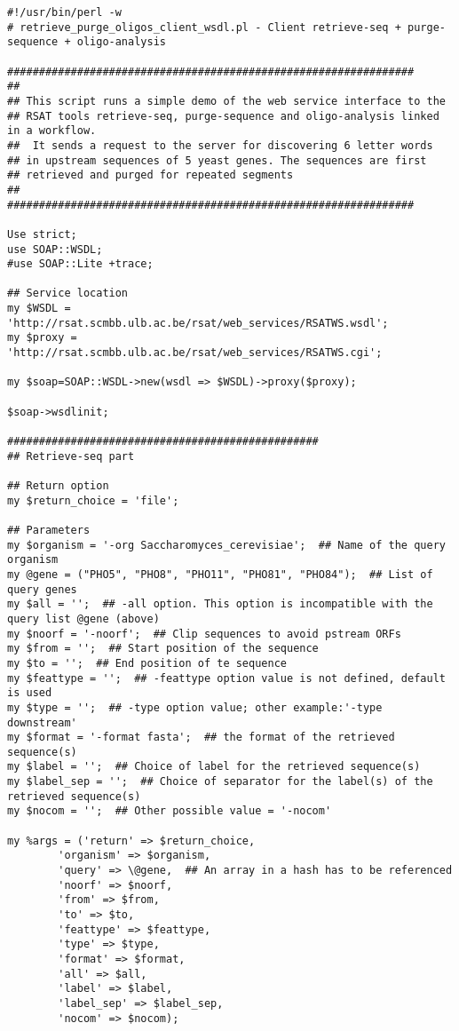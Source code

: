 \begin{footnotesize}
\begin{verbatim}
#!/usr/bin/perl -w
# retrieve_purge_oligos_client_wsdl.pl - Client retrieve-seq + purge-sequence + oligo-analysis

################################################################
##
## This script runs a simple demo of the web service interface to the
## RSAT tools retrieve-seq, purge-sequence and oligo-analysis linked in a workflow.
##  It sends a request to the server for discovering 6 letter words
## in upstream sequences of 5 yeast genes. The sequences are first
## retrieved and purged for repeated segments
##
################################################################

Use strict;
use SOAP::WSDL;
#use SOAP::Lite +trace;

## Service location
my $WSDL = 'http://rsat.scmbb.ulb.ac.be/rsat/web_services/RSATWS.wsdl';
my $proxy = 'http://rsat.scmbb.ulb.ac.be/rsat/web_services/RSATWS.cgi';

my $soap=SOAP::WSDL->new(wsdl => $WSDL)->proxy($proxy);

$soap->wsdlinit;

#################################################
## Retrieve-seq part

## Return option
my $return_choice = 'file';

## Parameters
my $organism = '-org Saccharomyces_cerevisiae';  ## Name of the query organism
my @gene = ("PHO5", "PHO8", "PHO11", "PHO81", "PHO84");  ## List of query genes
my $all = '';  ## -all option. This option is incompatible with the query list @gene (above)
my $noorf = '-noorf';  ## Clip sequences to avoid pstream ORFs
my $from = '';  ## Start position of the sequence
my $to = '';  ## End position of te sequence
my $feattype = '';  ## -feattype option value is not defined, default is used
my $type = '';  ## -type option value; other example:'-type downstream'
my $format = '-format fasta';  ## the format of the retrieved sequence(s)
my $label = '';  ## Choice of label for the retrieved sequence(s)
my $label_sep = '';  ## Choice of separator for the label(s) of the retrieved sequence(s)
my $nocom = '';  ## Other possible value = '-nocom'

my %args = ('return' => $return_choice,
	    'organism' => $organism,
	    'query' => \@gene,  ## An array in a hash has to be referenced
	    'noorf' => $noorf,
	    'from' => $from,
	    'to' => $to,
	    'feattype' => $feattype,
	    'type' => $type,
	    'format' => $format,
	    'all' => $all,
	    'label' => $label,
	    'label_sep' => $label_sep,
	    'nocom' => $nocom);


\end{verbatim}
\end{footnotesize}
